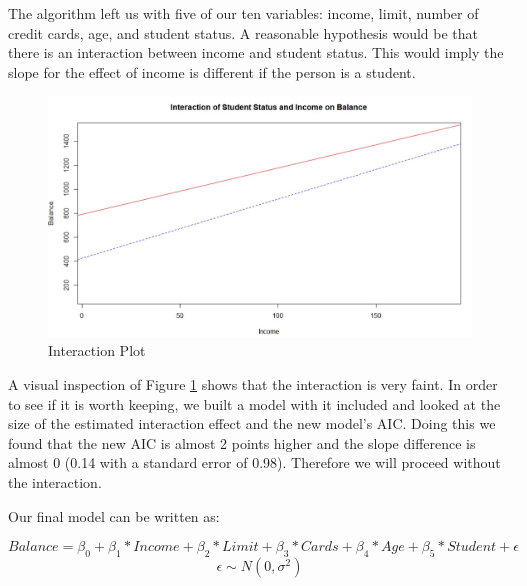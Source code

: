 \documentclass{article}
\begin{document}
The algorithm left us with five of our ten variables: income, limit, number of credit cards, age, and student status. A reasonable hypothesis would be that there is an interaction between income and student status. This would imply the slope for the effect of income is different if the person is a student. 

\begin{figure}
\centering
\includegraphics[scale=.7]{interaction.JPG}
\caption{Interaction Plot}
\label{interaction}
\end{figure}

A visual inspection of Figure \ref{interaction} shows that the interaction is very faint. In order to see if it is worth keeping, we built a model with it included and looked at the size of the estimated interaction effect and the new model's AIC. Doing this we found that the new AIC is almost 2 points higher and the slope difference is almost 0 (0.14 with a standard error of 0.98). Therefore we will proceed without the interaction.

Our final model can be written as:

\begin{equation}
Balance = \beta_0+ \beta_1 * Income + \beta_2 * Limit + \beta_3 * Cards + \beta_4 * Age +\beta_5*Student +\epsilon
\end{equation}
$$\epsilon \sim N(0, \sigma^2)
$$          
\end{document}
